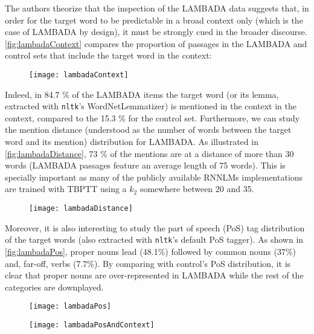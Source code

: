 The authors theorize that the inspection of the LAMBADA data suggests that, in order for the target word to be predictable in a broad context only (which is the case of LAMBADA by design), it must be strongly cued in the broader discourse. \autoref{fig:lambadaContext} compares the proportion of passages in the LAMBADA and control sets that include the target word in the context:

\begin{figure}[H]
	\centering
	\texttt{[image: lambadaContext]}
	\label{fig:lambadaContext}
\end{figure}

Indeed, in 84.7 \% of the LAMBADA items the target word (or its lemma, extracted with \texttt{nltk}'s WordNetLemmatizer) is mentioned in the context in the context, compared to the 15.3 \% for the control set. Furthermore, we can study the mention distance (understood as the number of words between the target word and its mention) distribution for LAMBADA. As illustrated in \autoref{fig:lambadaDistance}, 73 \% of the mentions are at a distance of more than 30 words (LAMBADA passages feature an average length of 75 words). This is specially important as many of the publicly available RNNLMs implementations are trained with TBPTT using a $k_2$ somewhere between 20 and 35.
 
\begin{figure}[H]
	\centering
	\texttt{[image: lambadaDistance]}
	\label{fig:lambadaDistance}
\end{figure}

Moreover, it is also interesting to study the part of speech (PoS) tag distribution of the target words (also extracted with \texttt{nltk}'s default PoS tagger). As shown in \autoref{fig:lambadaPos}, proper nouns lead (48.1\%) followed by common nouns (37\%) and, far-off, verbs
(7.7\%). By comparing with control's PoS distribution, it is clear that proper nouns are over-represented in LAMBADA while the rest of the categories are downplayed.

\begin{figure}[H]
	\centering
	\texttt{[image: lambadaPos]}
	\label{fig:lambadaPos}
\end{figure}

\begin{figure}[H]
	\centering
	\texttt{[image: lambadaPosAndContext]}
	\label{fig:lambadaPosAndContext}
\end{figure}

